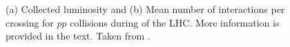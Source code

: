 \begin{figure}[t]
    \hspace{-3.95em}
    \caption{(a) Collected luminosity and (b) Mean number of interactions per crossing for $pp$ collisions during \RunTwo of the LHC. More information is provided in the text. Taken from .}
    \label{fig:run-2-data-taking}
\end{figure}


